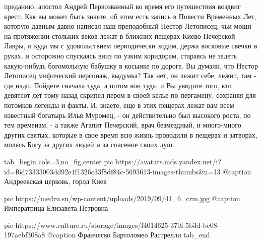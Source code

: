 преданию, апостол Андрей Первозванный во время его путешествия воздвиг крест.
Как вы может быть знаете, об этом есть запись в Повести Временных Лет, которую
давным-давно написал наш преподобный Нестор Летописец, чьи мощи на протяжении
стольких веков лежат в ближних пещерах Киево-Печерской Лавры, и куда мы с
удовольствием периодически ходим, держа восковые свечки в руках, и осторожно
спускаясь вниз по узким коридорам, стараясь не задеть какую-нибудь богомольную
бабушку в косынке по дороге. Вы думали, что Нестор Летописец мифический
персонаж, выдумка? Так нет, он лежит себе, лежит, там - где надо. Пойдете
сначала туда, а потом вон туда, и Вы увидите того, кто девятсот лет тому назад
скрипел пером в своей келье по пергамену, сохраняя для потомков легенды и
факты. И, знаете, еще в этих пещерах лежат вам всем известный богатырь Илья
Муромец, - он действительно был высокого роста, по тем временам, - а также
Агапит Печерский, врач безмездный, и много-много других святых, которые в свое
время всю жизнь проводили в пещерах и затворах, молясь Богу за других людей и
за спасение своих душ.

\ifcmt
  tab_begin cols=3,no_fig,center
     pic https://avatars.mds.yandex.net/i?id=f6d73333003dd92e4f1326c33f8df84c-5693613-images-thumbs&n=13
		 @caption Андреевская церковь, город Киев

		 pic https://medru.su/wp-content/uploads/2019/09/41_6_crm.jpg
		 @caption Императрица Елизавета Петровна

		 pic https://www.culture.ru/storage/images/f4014625-370f-5b3d-bc08-197aebf308a8
		 @caption Франческо Бартоломео Растрелли
  tab_end
\fi

